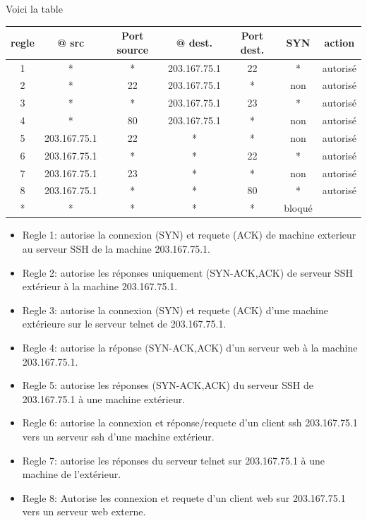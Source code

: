 \documentclass[a4paper,9pt]{article}
\theoremstyle{plain}
\theoremstyle{definition}
\begin{document}
\begin{correction}
Voici la table 
\begin{center}
\begin{tabular}{|c|c|c|c|c|c|c|}
\hline
regle & @ src & Port source &   @ dest.& Port dest. & SYN & action \\
\hline
\hline
1 & * & * & 203.167.75.1 & 22 & * & autorisé  \\
2 & * & 22 & 203.167.75.1 & * & non & autorisé  \\
3 & * & * & 203.167.75.1 & 23 & * & autorisé \\
4 & * & 80 & 203.167.75.1 & * & non & autorisé  \\
\hline
5 &  203.167.75.1 &  22 & *  & * & non & autorisé  \\
6 & 203.167.75.1 &  *  & *  & 22 & * & autorisé  \\
7 & 203.167.75.1 &  23 & *  & * & non & autorisé  \\
8 & 203.167.75.1 &  * & *  & 80 & * & autorisé \\
\hline
* & *& *& *& * & bloqué \\
\hline
\end{tabular}
\end{center}

\begin{itemize}
\item Regle 1: autorise la connexion (SYN) et requete (ACK) de machine exterieur au serveur SSH de la machine 203.167.75.1.
\item Regle 2: autorise les réponses uniquement (SYN-ACK,ACK) de serveur SSH extérieur à la machine 203.167.75.1.
\item Regle 3: autorise la connexion (SYN) et requete (ACK) d'une machine extérieure sur le serveur telnet de  203.167.75.1.
\item Regle 4: autorise la réponse (SYN-ACK,ACK) d'un serveur web à la machine 203.167.75.1.
\item Regle 5: autorise les réponses (SYN-ACK,ACK) du serveur SSH de 203.167.75.1 à une machine extérieur.
\item Regle 6: autorise la connexion et réponse/requete d'un client ssh  203.167.75.1 vers un serveur ssh d'une machine extérieur.
\item Regle 7: autorise les réponses du serveur telnet sur 203.167.75.1  à une machine de l'extérieur. 
\item Regle 8:  Autorise les connexion et requete d'un client web sur  203.167.75.1 vers un  serveur web externe.
\end{itemize}

\end{correction}
\end{document}
